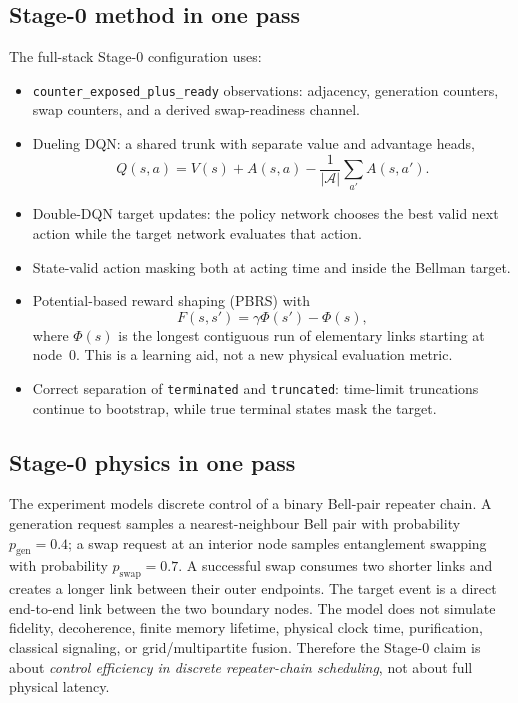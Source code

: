 \documentclass[11pt]{article}
\newcommand{\code}[1]{\texttt{#1}}
\newcommand{\pgen}{p_{\text{gen}}}
\newcommand{\pswap}{p_{\text{swap}}}
\begin{document}
\subsection{Stage-0 method in one pass}
The full-stack Stage-0 configuration uses:
\begin{itemize}
  \item \code{counter\_exposed\_plus\_ready} observations: adjacency, generation counters, swap counters, and a derived swap-readiness channel.
  \item Dueling DQN: a shared trunk with separate value and advantage heads,
  \begin{equation*}
    Q(s,a)=V(s)+A(s,a)-\frac{1}{|\mathcal{A}|}\sum_{a'}A(s,a').
  \end{equation*}
  \item Double-DQN target updates: the policy network chooses the best valid next
  action while the target network evaluates that action.
  \item State-valid action masking both at acting time and inside the Bellman target.
  \item Potential-based reward shaping (PBRS) with
  \begin{equation*}
    F(s,s')=\gamma\Phi(s')-\Phi(s),
  \end{equation*}
  where $\Phi(s)$ is the longest contiguous run of elementary links starting at
  node~0. This is a learning aid, not a new physical evaluation metric.
  \item Correct separation of \code{terminated} and \code{truncated}: time-limit
  truncations continue to bootstrap, while true terminal states mask the target.
\end{itemize}

\subsection{Stage-0 physics in one pass}
The experiment models discrete control of a binary Bell-pair repeater chain. A
generation request samples a nearest-neighbour Bell pair with probability
$\pgen=0.4$; a swap request at an interior node samples entanglement swapping with
probability $\pswap=0.7$. A successful swap consumes two shorter links and creates
a longer link between their outer endpoints. The target event is a direct
end-to-end link between the two boundary nodes. The model does not simulate
fidelity, decoherence, finite memory lifetime, physical clock time, purification,
classical signaling, or grid/multipartite fusion. Therefore the Stage-0 claim is
about \emph{control efficiency in discrete repeater-chain scheduling}, not about
full physical latency.
\end{document}
